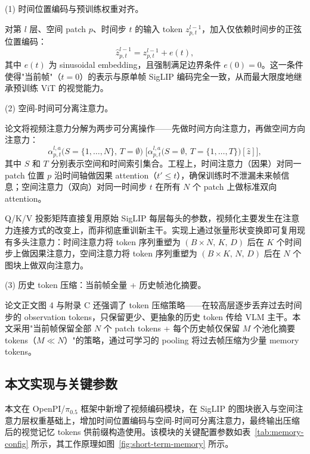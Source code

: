 (1) 时间位置编码与预训练权重对齐。

对第 $l$ 层、空间 patch $p$、时间步 $t$ 的输入 token $z^{l-1}_{p,t}$，加入仅依赖时间步的正弦位置编码：
\begin{equation}
  \hat{z}^{l-1}_{p,t} = z^{l-1}_{p,t} + e(t),
  \label{eq:temporal-pos-enc}
\end{equation}
其中 $e(t)$ 为 sinusoidal embedding，且强制满足边界条件 $e(0)=0$。这一条件使得"当前帧"（$t=0$）的表示与原单帧 SigLIP 编码完全一致，从而最大限度地继承预训练 ViT 的视觉能力。

(2) 空间-时间可分离注意力。

论文将视频注意力分解为两步可分离操作——先做时间方向注意力，再做空间方向注意力：
\begin{equation}
  \alpha^{l,a}_{p,t}\big(S=\{1,\dots,N\},\,T=\emptyset\big)\;
  \Big[\alpha^{l,a}_{p,t}\big(S=\emptyset,\,T=\{1,\dots,T\}\big)[\hat{z}]\Big],
  \label{eq:space-time-separable}
\end{equation}
其中 $S$ 和 $T$ 分别表示空间和时间索引集合。工程上，时间注意力（因果）对同一 patch 位置 $p$ 沿时间轴做因果 attention（$t' \leq t$），确保训练时不泄漏未来帧信息；空间注意力（双向）对同一时间步 $t$ 在所有 $N$ 个 patch 上做标准双向 attention。

Q/K/V 投影矩阵直接复用原始 SigLIP 每层每头的参数，视频化主要发生在注意力连接方式的改变上，而非彻底重训新主干。实现上通过张量形状变换即可复用现有多头注意力：时间注意力将 token 序列重塑为 $(B\times N,\,K,\,D)$ 后在 $K$ 个时间步上做因果注意力，空间注意力将 token 序列重塑为 $(B\times K,\,N,\,D)$ 后在 $N$ 个图块上做双向注意力。

(3) 历史 token 压缩：当前帧全量 + 历史帧池化摘要。

论文正文图 4 与附录 C 还强调了 token 压缩策略——在较高层逐步丢弃过去时间步的 observation tokens，只保留更少、更抽象的历史 token 传给 VLM 主干。本文采用"当前帧保留全部 $N$ 个 patch tokens + 每个历史帧仅保留 $M$ 个池化摘要 tokens（$M \ll N$）"的策略，通过可学习的 pooling 将过去帧压缩为少量 memory tokens。

\subsection{本文实现与关键参数}

本文在 OpenPI/$\pi_{0.5}$ 框架中新增了视频编码模块，在 SigLIP 的图块嵌入与空间注意力层权重基础上，增加时间位置编码与空间-时间可分离注意力，最终输出压缩后的视觉记忆 tokens 供前缀构造使用。该模块的关键配置参数如表~\ref{tab:memory-config} 所示，其工作原理如图~\ref{fig:short-term-memory} 所示。

